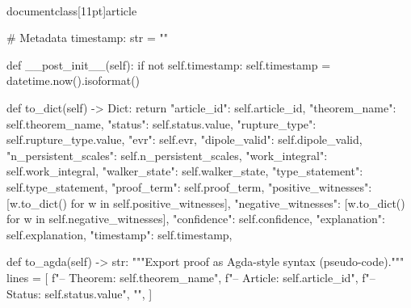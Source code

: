 \\documentclass[11pt]{article}
\begin{document}
\begin{CodeBlock}
    # Metadata
    timestamp: str = ""

    def __post_init__(self):
        if not self.timestamp:
            self.timestamp = datetime.now().isoformat()

    def to_dict(self) -> Dict:
        return {
            "article_id": self.article_id,
            "theorem_name": self.theorem_name,
            "status": self.status.value,
            "rupture_type": self.rupture_type.value,
            "evr": self.evr,
            "dipole_valid": self.dipole_valid,
            "n_persistent_scales": self.n_persistent_scales,
            "work_integral": self.work_integral,
            "walker_state": self.walker_state,
            "type_statement": self.type_statement,
            "proof_term": self.proof_term,
            "positive_witnesses": [w.to_dict() for w in self.positive_witnesses],
            "negative_witnesses": [w.to_dict() for w in self.negative_witnesses],
            "confidence": self.confidence,
            "explanation": self.explanation,
            "timestamp": self.timestamp,
        }

    def to_agda(self) -> str:
        """Export proof as Agda-style syntax (pseudo-code)."""
        lines = [
            f"-- Theorem: {self.theorem_name}",
            f"-- Article: {self.article_id}",
            f"-- Status: {self.status.value}",
            "",
        ]


\end{CodeBlock}
\end{document}
